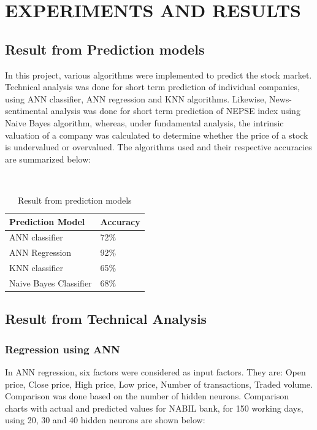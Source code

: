 \section{EXPERIMENTS AND RESULTS}
\subsection{Result from Prediction models}
In this project, various algorithms were implemented to predict the stock market. Technical analysis was done for short term prediction of individual companies, using ANN classifier, ANN regression and KNN algorithms. Likewise, News-sentimental analysis was done for short term prediction of NEPSE index using Naive Bayes algorithm, whereas, under fundamental analysis, the intrinsic valuation of a company was calculated to determine whether the price of a stock is undervalued or overvalued. The algorithms used and their respective accuracies are summarized below:

~

\begin{table}[h!]
	\centering
	\begin{tabular}{|l|l|}
	\hline
	\textbf{Prediction Model} & \textbf{Accuracy}\\
	\hline
	ANN classifier & 72\%\\
	\hline
	ANN Regression & 92\%\\
	\hline
	KNN classifier & 65\%\\
	\hline	
	Naive Bayes Classifier & 68\%\\
	\hline
	\end{tabular}
	\caption{Result from prediction models}
	\label{tab:Result from prediction models}
\end{table}

\subsection{Result from Technical Analysis}
\subsubsection{Regression using ANN}
In ANN regression, six factors were considered as input factors. They are: Open price, Close price, High price, Low price, Number of transactions, Traded volume. Comparison was done based on the number of hidden neurons. Comparison charts with actual and predicted values for NABIL bank, for 150 working days, using 20, 30 and 40 hidden neurons are shown below:

